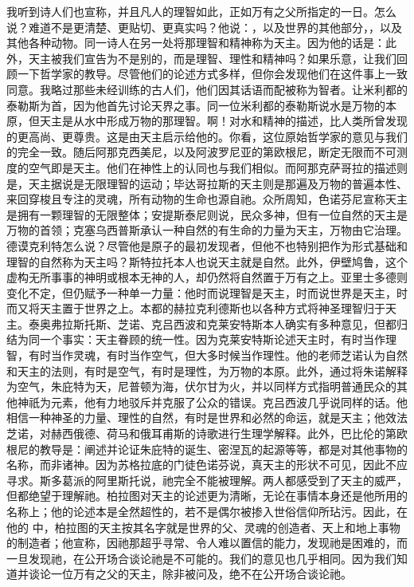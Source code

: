 我听到诗人们也宣称，并且凡人的理智如此，正如万有之父所指定的一日。怎么说？难道不是更清楚、更贴切、更真实吗？他说：，以及世界的其他部分，，以及其他各种动物。同一诗人在另一处将那理智和精神称为天主。因为他的话是：此外，天主被我们宣告为不是别的，而是理智、理性和精神吗？如果乐意，让我们回顾一下哲学家的教导。尽管他们的论述方式多样，但你会发现他们在这件事上一致同意。我略过那些未经训练的古人们，他们因其话语而配被称为智者。让米利都的泰勒斯为首，因为他首先讨论天界之事。同一位米利都的泰勒斯说水是万物的本原，但天主是从水中形成万物的那理智。啊！对水和精神的描述，比人类所曾发现的更高尚、更尊贵。这是由天主启示给他的。你看，这位原始哲学家的意见与我们的完全一致。随后阿那克西美尼，以及阿波罗尼亚的第欧根尼，断定无限而不可测度的空气即是天主。他们在神性上的认同也与我们相似。而阿那克萨哥拉的描述则是，天主据说是无限理智的运动；毕达哥拉斯的天主则是那遍及万物的普遍本性、来回穿梭且专注的灵魂，所有动物的生命也源自祂。众所周知，色诺芬尼宣称天主是拥有一颗理智的无限整体；安提斯泰尼则说，民众多神，但有一位自然的天主是万物的首领；克塞乌西普斯承认一种自然的有生命的力量为天主，万物由它治理。德谟克利特怎么说？尽管他是原子的最初发现者，但他不也特别把作为形式基础和理智的自然称为天主吗？斯特拉托本人也说天主就是自然。此外，伊壁鸠鲁，这个虚构无所事事的神明或根本无神的人，却仍然将自然置于万有之上。亚里士多德则变化不定，但仍赋予一种单一力量：他时而说理智是天主，时而说世界是天主，时而又将天主置于世界之上。本都的赫拉克利德斯也以各种方式将神圣理智归于天主。泰奥弗拉斯托斯、芝诺、克吕西波和克莱安特斯本人确实有多种意见，但都归结为同一个事实：天主眷顾的统一性。因为克莱安特斯论述天主时，有时当作理智，有时当作灵魂，有时当作空气，但大多时候当作理性。他的老师芝诺认为自然和天主的法则，有时是空气，有时是理性，为万物的本原。此外，通过将朱诺解释为空气，朱庇特为天，尼普顿为海，伏尔甘为火，并以同样方式指明普通民众的其他神祇为元素，他有力地驳斥并克服了公众的错误。克吕西波几乎说同样的话。他相信一种神圣的力量、理性的自然，有时是世界和必然的命运，就是天主；他效法芝诺，对赫西俄德、荷马和俄耳甫斯的诗歌进行生理学解释。此外，巴比伦的第欧根尼的教导是：阐述并论证朱庇特的诞生、密涅瓦的起源等等，都是对其他事物的名称，而非诸神。因为苏格拉底的门徒色诺芬说，真天主的形状不可见，因此不应寻求。斯多葛派的阿里斯托说，祂完全不能被理解。两人都感受到了天主的威严，但都绝望于理解祂。柏拉图对天主的论述更为清晰，无论在事情本身还是他所用的名称上；他的论述本是全然超性的，若不是偶尔被掺入世俗信仰所玷污。因此，在他的  中，柏拉图的天主按其名字就是世界的父、灵魂的创造者、天上和地上事物的制造者；他宣称，因祂那超乎寻常、令人难以置信的能力，发现祂是困难的，而一旦发现祂，在公开场合谈论祂是不可能的。我们的意见也几乎相同。因为我们知道并谈论一位万有之父的天主，除非被问及，绝不在公开场合谈论祂。\par


